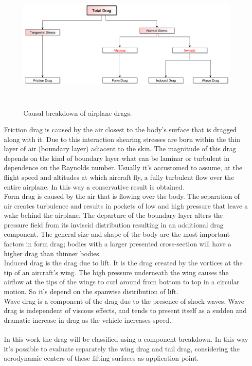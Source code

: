 \begin{figure}[H]
\centering
{\includegraphics[height=6cm]{Immagini/dragcausal.pdf}} 
\caption{Causal breakdown of airplane drags.}
\end{figure}


Friction drag is caused by the air closest to the body’s surface that is dragged along with it. Due to this interaction shearing stresses are born within the thin layer of air (boundary layer) adiacent to the skin. The magnitude of this drag depends on the kind of boundary layer what can be laminar or turbulent in dependence on the Raynolds number. Usually it's accustomed to assume, at the flight speed and altitudes at which aircraft fly, a fully turbulent flow over the entire airplane. In this way a conservative result is obtained.\\
Form drag is caused by the air that is flowing over the body. The separation of air creates turbulence and results in pockets of low and high pressure that leave a wake behind the airplane. The departure of the boundary layer alters the pressure field from its inviscid distribution resulting in an additional drag component. The general size and shape of the body are the most important factors in form drag; bodies with a larger presented cross-section will have a higher drag than thinner bodies.\\
Induced drag is the drag due to lift. It is the drag created by the vortices at the tip of an aircraft's wing. The high pressure underneath the wing causes the airflow at the tips of the wings to curl around from bottom to top in a circular motion. So it's depend on the spanwise distribution of lift. \\
Wave drag is a component of the drag due to the presence of shock waves. Wave drag is independent of viscous effects, and tends to present itself as a sudden and dramatic increase in drag as the vehicle increases speed.
\\ \\ 
In this work the drag will be classified using a component breakdown. In this way it's possible to evaluate separately the wing drag and tail drag, considering the aerodynamic centers of these lifting surfaces as application point.

